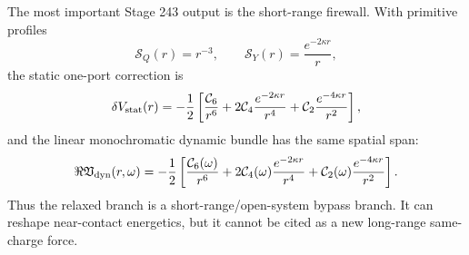 The most important Stage 243 output is the short-range firewall.  With primitive profiles
\begin{equation}
\label{eq:app-part08-stage243-source-profiles}
\mathcal S_Q(r)=r^{-3},
\qquad
\mathcal S_Y(r)=\frac{e^{-2\kappa r}}{r},
\end{equation}
the static one-port correction is
\begin{equation}
\label{eq:app-part08-stage243-static-correction}
\delta V_{\rm stat}(r)
=
-\frac12\left[
\frac{\mathcal C_6}{r^6}
+2\mathcal C_4\frac{e^{-2\kappa r}}{r^4}
+\mathcal C_2\frac{e^{-4\kappa r}}{r^2}
\right],
\end{equation}
and the linear monochromatic dynamic bundle has the same spatial span:
\begin{equation}
\label{eq:app-part08-stage243-dynamic-correction}
\Re\mathfrak V_{\rm dyn}(r,\omega)
=
-\frac12\left[
\frac{\mathcal C_6(\omega)}{r^6}
+2\mathcal C_4(\omega)\frac{e^{-2\kappa r}}{r^4}
+\mathcal C_2(\omega)\frac{e^{-4\kappa r}}{r^2}
\right].
\end{equation}
Thus the relaxed branch is a short-range/open-system bypass branch.  It can reshape near-contact energetics, but it cannot be cited as a new long-range same-charge force.
